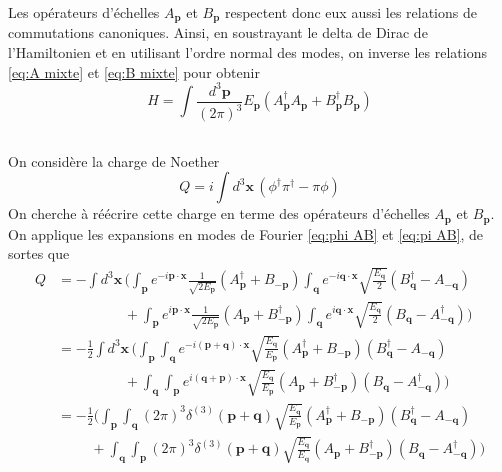 \documentclass{article}
\numberwithin{equation}{section}
\begin{document}
Les opérateurs d'échelles $A_{\mathbf{p}}$ et $B_{\mathbf{p}}$ respectent donc eux aussi les relations de commutations canoniques. 
Ainsi, en soustrayant le delta de Dirac de l'Hamiltonien et en utilisant l'ordre normal des modes, on inverse les relations 
\eqref{eq:A mixte} et \eqref{eq:B mixte} pour obtenir
\begin{equation}
        H = \int \frac{d^{3}\mathbf{p}}{(2\pi)^{3}} E_{\mathbf{p}}(A^{\dagger}_\mathbf{p}A_{\mathbf{p}} + B^{\dagger}_{\mathbf{p}}B_{\mathbf{p}})
\end{equation} 


\subsection{}
On considère la charge de Noether
\begin{equation}
        Q = i\int d^{3}\mathbf{x}\, (\phi^{\dagger}\pi^{\dagger} - \pi \phi)
\end{equation} 
On cherche à réécrire cette charge en terme des opérateurs d'échelles $A_{\mathbf{p}}$ et $B_{\mathbf{p}}$. On applique les expansions en modes 
de Fourier \eqref{eq:phi AB} et \eqref{eq:pi AB}, de sortes que
\begin{align*}
        Q &=  
        -\int d^{3}\mathbf{x}\, \bigg(  
\int_{\mathbf{p}}e^{-i \mathbf{p} \cdot \mathbf{x}} \frac{1}{\sqrt{2 E_{\mathbf{p}}}} (A^{\dagger}_{\mathbf{p}} + B_{-\mathbf{p}})
\int_{\mathbf{q}} e^{-i \mathbf{q} \cdot \mathbf{x}} \sqrt{\frac{E_{\mathbf{q}}}{2 }} (B^{\dagger}_{\mathbf{q}} - A_{-\mathbf{q}}) \\
          &\hspace{2cm}+ 
\int_{\mathbf{p}}e^{i \mathbf{p} \cdot \mathbf{x}} \frac{1}{\sqrt{2 E_{\mathbf{p}}}} (A_{\mathbf{p}} + B^{\dagger}_{-\mathbf{p}})
\int_{\mathbf{q}} e^{i \mathbf{q} \cdot \mathbf{x}} \sqrt{\frac{E_{\mathbf{q}}}{2 }} (B_{\mathbf{q}} - A^{\dagger}_{-\mathbf{q}}) 
\bigg)  \\
&= 
        -\frac{1}{2}\int d^{3}\mathbf{x}\, \bigg(  
\int_{\mathbf{p}} \int_{\mathbf{q}} e^{-i (\mathbf{p} + \mathbf{q}) \cdot \mathbf{x}} \sqrt{\frac{E_{\mathbf{q}}}{ E_{\mathbf{p}}}} 
(A^{\dagger}_{\mathbf{p}} + B_{-\mathbf{p}})(B^{\dagger}_{\mathbf{q}} - A_{-\mathbf{q}}) \\
          &\hspace{2cm}+ 
\int_{\mathbf{q}} \int_{\mathbf{p}} e^{i(\mathbf{q} + \mathbf{p}) \cdot \mathbf{x}} \sqrt{\frac{E_{\mathbf{q}}}{E_{\mathbf{p}} }} 
 (A_{\mathbf{p}} + B^{\dagger}_{-\mathbf{p}})(B_{\mathbf{q}} - A^{\dagger}_{-\mathbf{q}})\bigg)  \\
&= 
        -\frac{1}{2} \bigg(  
                \int_{\mathbf{p}} \int_{\mathbf{q}} (2\pi)^{3}\delta^{(3)}(\mathbf{p} + \mathbf{q}) \sqrt{\frac{E_{\mathbf{q}}}{ E_{\mathbf{p}}}} 
(A^{\dagger}_{\mathbf{p}} + B_{-\mathbf{p}})(B^{\dagger}_{\mathbf{q}} - A_{-\mathbf{q}}) \\
          &\hspace{1cm}+ 
          \int_{\mathbf{q}} \int_{\mathbf{p}} (2\pi)^{3}\delta^{(3)}(\mathbf{p} + \mathbf{q})  \sqrt{\frac{E_{\mathbf{q}}}{E_{\mathbf{q}} }}
 (A_{\mathbf{p}} + B^{\dagger}_{-\mathbf{p}})(B_{\mathbf{q}} - A^{\dagger}_{-\mathbf{q}})\bigg)  \\
\end{align*}
\end{document}
